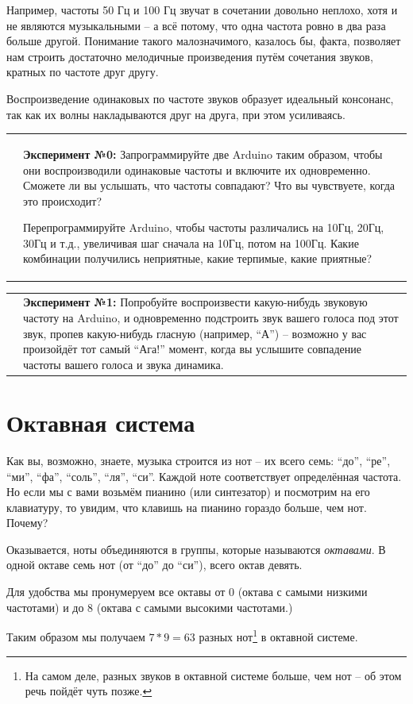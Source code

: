 \documentclass[a4paper,twoside]{book}
\newcommand{\experiment}[2]{
  \vspace{8pt}
  \begin{tabularx}{\textwidth}{m{1cm} m{9cm}}
    
    & \textbf{Эксперимент №#1:} #2 \\
  \end{tabularx}
}
\begin{document}
Например, частоты 50 Гц и 100 Гц звучат в сочетании довольно неплохо, хотя и не
являются музыкальными -- а всё потому, что одна частота ровно в два раза больше
другой. Понимание такого малозначимого, казалось бы, факта, позволяет нам
строить достаточно мелодичные произведения путём сочетания звуков, кратных по
частоте друг другу.

Воспроизведение одинаковых по частоте звуков образует идеальный консонанс, так
как их волны накладываются друг на друга, при этом усиливаясь.

\experiment{0}{ Запрограммируйте две Arduino таким образом, чтобы они
  воспроизводили одинаковые частоты и включите их одновременно. Сможете ли вы
  услышать, что частоты совпадают?  Что вы чувствуете, когда это происходит?

  Перепрограммируйте Arduino, чтобы частоты различались на 10Гц, 20Гц, 30Гц и
  т.д., увеличивая шаг сначала на 10Гц, потом на 100Гц. Какие комбинации
  получились неприятные, какие терпимые, какие приятные?}

\experiment{1}{ Попробуйте воспроизвести какую-нибудь звуковую частоту на Arduino,
  и одновременно подстроить звук вашего голоса под этот звук, пропев
  какую-нибудь гласную (например, ``А'') -- возможно у вас произойдёт тот самый
  ``Ага!'' момент, когда вы услышите совпадение частоты вашего голоса и звука
  динамика.}

\section{Октавная система}

Как вы, возможно, знаете, музыка строится из нот -- их всего семь: ``до'',
``ре'', ``ми'', ``фа'', ``соль'', ``ля'', ``си''. Каждой ноте соответствует
определённая частота. Но если мы с вами возьмём пианино (или синтезатор) и
посмотрим на его клавиатуру, то увидим, что клавишь на пианино гораздо больше,
чем нот.  Почему?

Оказывается, ноты объединяются в группы, которые называются \emph{октавами}. В
одной октаве семь нот (от ``до'' до ``си''), всего октав девять.

Для удобства мы пронумеруем все октавы от 0 (октава с самыми низкими частотами)
и до 8 (октава с самыми высокими частотами.)

Таким образом мы получаем $7 * 9 = 63$ разных нот\footnote{На самом деле, разных
звуков в октавной системе больше, чем нот -- об этом речь пойдёт чуть позже.} в
октавной системе.
\end{document}
